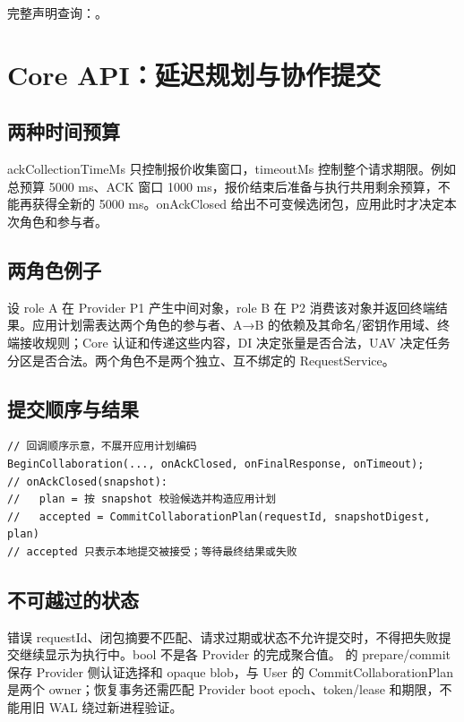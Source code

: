 完整声明查询：。

\section{Core API：延迟规划与协作提交}

\subsection{两种时间预算}
ackCollectionTimeMs 只控制报价收集窗口，timeoutMs 控制整个请求期限。例如总预算 5000 ms、ACK 窗口 1000 ms，报价结束后准备与执行共用剩余预算，不能再获得全新的 5000 ms。onAckClosed 给出不可变候选闭包，应用此时才决定本次角色和参与者。

\subsection{两角色例子}
设 role A 在 Provider P1 产生中间对象，role B 在 P2 消费该对象并返回终端结果。应用计划需表达两个角色的参与者、A→B 的依赖及其命名/密钥作用域、终端接收规则；Core 认证和传递这些内容，DI 决定张量是否合法，UAV 决定任务分区是否合法。两个角色不是两个独立、互不绑定的 RequestService。

\subsection{提交顺序与结果}

\begin{Verbatim}[fontsize=\footnotesize,breaklines,breakanywhere]
// 回调顺序示意，不展开应用计划编码
BeginCollaboration(..., onAckClosed, onFinalResponse, onTimeout);
// onAckClosed(snapshot):
//   plan = 按 snapshot 校验候选并构造应用计划
//   accepted = CommitCollaborationPlan(requestId, snapshotDigest, plan)
// accepted 只表示本地提交被接受；等待最终结果或失败
\end{Verbatim}

\subsection{不可越过的状态}
错误 requestId、闭包摘要不匹配、请求过期或状态不允许提交时，不得把失败提交继续显示为执行中。bool 不是各 Provider 的完成聚合值。 的 prepare/commit 保存 Provider 侧认证选择和 opaque blob，与 User 的 CommitCollaborationPlan 是两个 owner；恢复事务还需匹配 Provider boot epoch、token/lease 和期限，不能用旧 WAL 绕过新进程验证。

